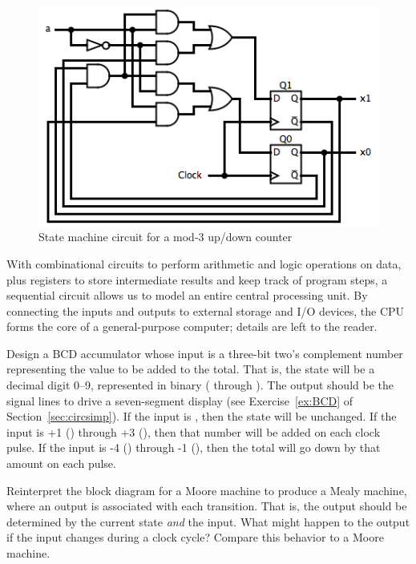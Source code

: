 \begin{figure}
\includegraphics[width=!,height=!,scale=0.75]{graphics/Mod3Counter.png}
\caption{State machine circuit for a mod-3 up/down counter}
\label{fig:Mod3Counter}
\end{figure}

\begin{tailquote}
With combinational circuits to perform arithmetic and logic operations on data, plus registers to store intermediate results and keep track of program steps, a sequential circuit allows us to model an entire central processing unit. By connecting the inputs and outputs to external storage and I/O devices, the CPU forms the core of a general-purpose computer; details are left to the reader.
\end{tailquote}
\begin{exercises}
\problem Design a BCD accumulator whose input is a three-bit two's complement number representing the value to be added to the total. That is, the state will be a decimal digit 0--9, represented in binary (\0\0\0\0 through \1\0\0\1). The output should be the signal lines to drive a seven-segment display (see Exercise~\ref{ex:BCD} of Section~\ref{sec:circsimp}). If the input is \0\0\0, then the state will be unchanged. If the input is +1 (\0\0\1) through +3 (\0\1\1), then that number will be added on each clock pulse. If the input is -4 (\1\0\0) through -1 (\1\1\1), then the total will go down by that amount on each pulse.

\problem Reinterpret the block diagram for a Moore machine to produce a Mealy machine, where an output is associated with each transition. That is, the output should be determined by the current state \emph{and} the input. What might happen to the output if the input changes during a clock cycle? Compare this behavior to a Moore machine.
\end{exercises}



